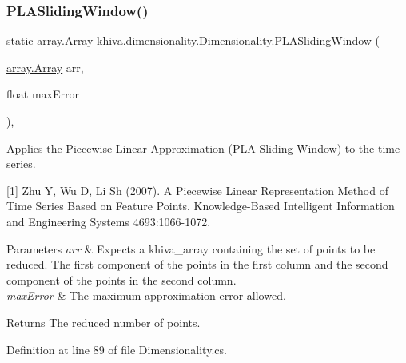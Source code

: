 \mbox{\label{classkhiva_1_1dimensionality_1_1_dimensionality_a4c165a099afe2a32612b1b45f7b317c7}} 
\subsubsection{\texorpdfstring{P\+L\+A\+Sliding\+Window()}{PLASlidingWindow()}}
{\footnotesize\ttfamily static \mbox{\hyperlink{classkhiva_1_1array_1_1_array}{array.\+Array}} khiva.\+dimensionality.\+Dimensionality.\+P\+L\+A\+Sliding\+Window (\begin{DoxyParamCaption}\item[{\mbox{\hyperlink{classkhiva_1_1array_1_1_array}{array.\+Array}}}]{arr,  }\item[{float}]{max\+Error }\end{DoxyParamCaption})\hspace{0.3cm}{\ttfamily [inline]}, {\ttfamily [static]}}



Applies the Piecewise Linear Approximation (P\+LA Sliding Window) to the time series. 

\mbox{[}1\mbox{]} Zhu Y, Wu D, Li Sh (2007). A Piecewise Linear Representation Method of Time Series Based on Feature Points. Knowledge-\/\+Based Intelligent Information and Engineering Systems 4693\+:1066-\/1072. 


\begin{DoxyParams}{Parameters}
{\em arr} & Expects a khiva\+\_\+array containing the set of points to be reduced. The first component of the points in the first column and the second component of the points in the second column.\\
\hline
{\em max\+Error} & The maximum approximation error allowed.\\
\hline
\end{DoxyParams}
\begin{DoxyReturn}{Returns}
The reduced number of points.
\end{DoxyReturn}


Definition at line 89 of file Dimensionality.\+cs.

\mbox{\label{classkhiva_1_1dimensionality_1_1_dimensionality_a6d2b5b3b9a7ce8f22f61e4e149975fa4}} 
